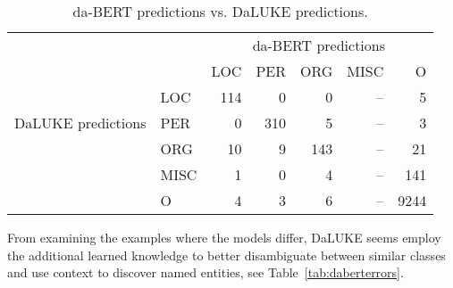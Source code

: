 \documentclass[main.tex]{subfiles}
\begin{document}
\begin{table}[H]
    \centering
    \begin{tabular}{l l | r r r r r }
        & &	\multicolumn{5}{c}{da-BERT predictions}	\\
        \multirow{5}{*}{DaLUKE predictions} & & LOC & PER & ORG & MISC & O \\\hline
        & LOC  & 114 & 0   & 0   &  --    & 5  \\
        & PER  & 0   & 310 & 5   &  --    & 3  \\
        & ORG  & 10  & 9   & 143 &  --    & 21 \\
        & MISC & 1   & 0   & 4   &  --    & 141\\
        & O    & 4   & 3   & 6   &  --    & 9244
    \end{tabular}
    \label{tab:dabertcompare}
    \caption{
        da-BERT predictions vs. DaLUKE predictions.
    }
\end{table}\noindent
From examining the examples where the models differ, DaLUKE seems employ the additional learned knowledge to better disambiguate between similar classes and use context to discover named entities, see Table~\ref{tab:daberterrors}.
\end{document}
